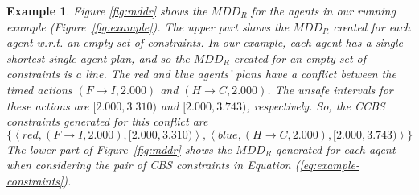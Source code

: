\documentclass[review]{elsarticle}
\newtheorem{example}{Example}
\newcommand{\tuple}[1]{\ensuremath{\left \langle #1 \right \rangle }}
\newcommand{\mddr}{\ensuremath{MDD_R}\xspace}
\newcommand{\ccbs}{\ac{CCBS}\xspace}
\newcommand{\cbs}{\ac{CBS}\xspace}
\begin{document}
\begin{example}
Figure \ref{fig:mddr} shows the \mddr for the agents in our running example (Figure~\ref{fig:example}). The upper part shows the \mddr created for each agent w.r.t. an empty set of constraints. 
In our example, each agent has a single shortest single-agent plan, and so the \mddr 
created for an empty set of constraints is a line. 
The red and blue agents' plans have a conflict between the timed actions $(F\rightarrow I, 2.000)$ and $(H \rightarrow C, 2.000)$. 
The unsafe intervals for these actions are $[2.000,3.310)$ and $[2.000,3.743)$, respectively. 
So, the \ccbs constraints generated for this conflict are
\begin{equation}
    \{ \tuple{red, (F\rightarrow I, 2.000), [2.000,3.310)}, 
    \tuple{blue, (H\rightarrow C, 2.000), [2.000,3.743)} \}
    \label{eq:example-constraints}
\end{equation}
The lower part of Figure~\ref{fig:mddr} shows the \mddr generated for each agent when considering the pair of \cbs constraints in Equation (\ref{eq:example-constraints}).
\end{example}




\end{document}
